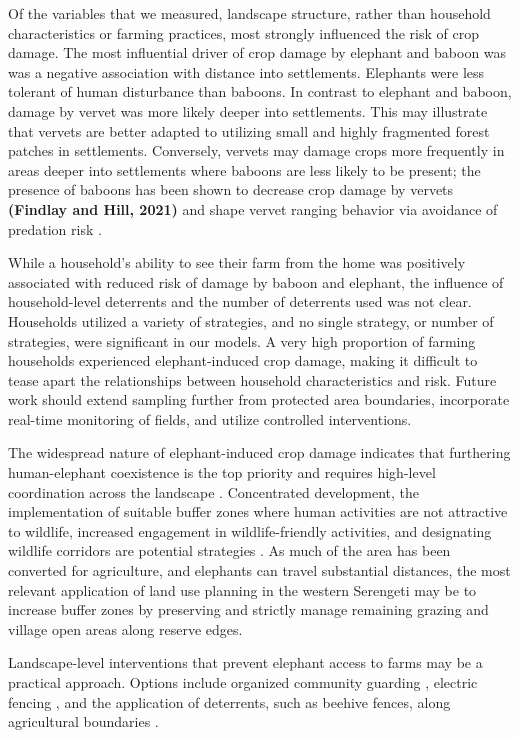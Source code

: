 \documentclass[12pt,]{article}
\begin{document}
Of the variables that we measured, landscape structure, rather than household characteristics or farming practices, most strongly influenced the risk of crop damage. The most influential driver of crop damage by elephant and baboon was
was a negative association with distance into settlements. Elephants were less tolerant of human disturbance than baboons. In contrast to elephant and baboon, damage by vervet was more likely deeper into settlements. This may illustrate that vervets are better adapted to utilizing small and highly fragmented forest patches in settlements. Conversely, vervets may damage crops more frequently in areas deeper into settlements where baboons are less likely to be present; the presence of baboons has been shown to decrease crop damage by vervets \citep{Findlay2020} \textbf{(Findlay and Hill, 2021)} and shape vervet ranging behavior via avoidance of predation risk \citep{Willems2009}. 

While a household's ability to see their farm from the home was positively associated with reduced risk of damage by baboon and elephant, the influence of household-level deterrents and the number of deterrents used was not clear. Households utilized a variety of strategies, and no single strategy, or number of strategies, were significant in our models. A very high proportion of farming households experienced elephant-induced crop damage, making it difficult to tease apart the relationships between household characteristics and risk. Future work should extend sampling further from protected area boundaries, incorporate real-time monitoring of fields, and utilize controlled interventions.

The widespread nature of elephant-induced crop damage indicates that furthering human-elephant coexistence is the top priority and requires high-level coordination across the landscape \citep{Shaffer2019}. Concentrated development, the implementation of suitable buffer zones where human activities are not attractive to wildlife, increased engagement in wildlife-friendly activities, and designating wildlife corridors are potential strategies \citep{Pozo2018, Nelson2003, Fernando2005}. As much of the area has been converted for agriculture, and elephants can travel substantial distances, the most relevant application of land use planning in the western Serengeti may be to increase buffer zones by preserving and strictly manage remaining grazing and village open areas along reserve edges. 

Landscape-level interventions that prevent elephant access to farms may be a practical approach. Options include organized community guarding \citep{DenningerSnyder2020}, electric fencing \citep{Kioko2008, Pekor2019, OConnellRod2000}, and the application of deterrents, such as beehive fences, along agricultural boundaries \citep{Scheijen2018}. 
\end{document}
